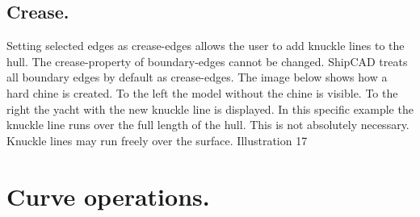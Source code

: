 \documentclass[12pt]{article}
\begin{document}
\subsection{Crease.}
Setting selected edges as crease-edges allows the user to add knuckle lines to the hull. The
crease-property of boundary-edges cannot be changed. ShipCAD treats all boundary edges by
default as crease-edges. The image below shows how a hard chine is created. To the left the model
without the chine is visible. To the right the yacht with the new knuckle line is displayed. In this
specific example the knuckle line runs over the full length of the hull. This is not absolutely
necessary. Knuckle lines may run freely over the surface.
Illustration 17

\section{Curve operations.}
\end{document}
